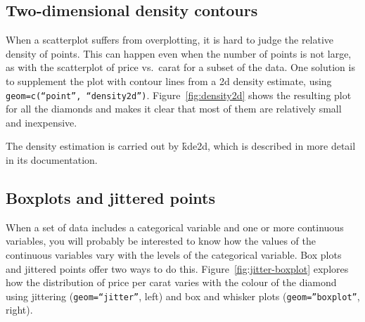 % 


\subsection{Two-dimensional density contours}
\label{sub:density2d}

When a scatterplot suffers from overplotting, it is hard to judge the relative density of points.  This can happen even when the number of points is not large, as with the scatterplot of price vs.\ carat for a subset of the data.  One solution is to supplement the plot with contour lines from a 2d density estimate, using {\tt geom=c(``point'', ``density2d'')}.  Figure~\ref{fig:density2d} shows the resulting plot for all the diamonds and makes it clear that most of them are relatively small and inexpensive.

% 


The density estimation is carried out by \f{kde2d}, which is described in more detail in its documentation.

\subsection{Boxplots and jittered points}
\label{sub:boxplot}

When a set of data includes a categorical variable and one or more continuous variables, you will probably be interested to know how the values of the continuous variables vary with the levels of the categorical variable.  Box plots and jittered points offer two ways to do this.  Figure~\ref{fig:jitter-boxplot} explores how the distribution of price per carat varies with the colour of the diamond using jittering ({\tt geom=``jitter''}, left) and box and whisker plots ({\tt geom=''boxplot''}, right).

% 


